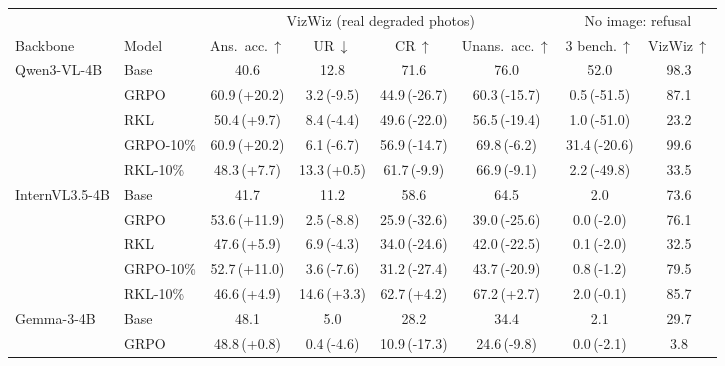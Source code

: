 \begin{table}[t]
\centering\small
\setlength{\tabcolsep}{5pt}
\begin{tabular}{llcccc|cc}
\toprule
& & \multicolumn{4}{c|}{VizWiz (real degraded photos)} & \multicolumn{2}{c}{No image: refusal} \\
\cmidrule(lr){3-6}\cmidrule(lr){7-8}
Backbone & Model & Ans.\ acc.\,$\uparrow$ & UR\,$\downarrow$ & CR\,$\uparrow$ & Unans.\ acc.\,$\uparrow$ & 3 bench.\,$\uparrow$ & VizWiz\,$\uparrow$ \\
\midrule
\multirow{5}{*}{Qwen3-VL-4B} & Base & 40.6 & 12.8 & 71.6 & 76.0 & 52.0 & 98.3 \\
 & GRPO & 60.9\,{\scriptsize(+20.2)} & 3.2\,{\scriptsize(-9.5)} & 44.9\,{\scriptsize(-26.7)} & 60.3\,{\scriptsize(-15.7)} & 0.5\,{\scriptsize(-51.5)} & 87.1 \\
 & RKL & 50.4\,{\scriptsize(+9.7)} & 8.4\,{\scriptsize(-4.4)} & 49.6\,{\scriptsize(-22.0)} & 56.5\,{\scriptsize(-19.4)} & 1.0\,{\scriptsize(-51.0)} & 23.2 \\
 & GRPO-10\% & 60.9\,{\scriptsize(+20.2)} & 6.1\,{\scriptsize(-6.7)} & 56.9\,{\scriptsize(-14.7)} & 69.8\,{\scriptsize(-6.2)} & 31.4\,{\scriptsize(-20.6)} & 99.6 \\
 & RKL-10\% & 48.3\,{\scriptsize(+7.7)} & 13.3\,{\scriptsize(+0.5)} & 61.7\,{\scriptsize(-9.9)} & 66.9\,{\scriptsize(-9.1)} & 2.2\,{\scriptsize(-49.8)} & 33.5 \\
\midrule
\multirow{5}{*}{InternVL3.5-4B} & Base & 41.7 & 11.2 & 58.6 & 64.5 & 2.0 & 73.6 \\
 & GRPO & 53.6\,{\scriptsize(+11.9)} & 2.5\,{\scriptsize(-8.8)} & 25.9\,{\scriptsize(-32.6)} & 39.0\,{\scriptsize(-25.6)} & 0.0\,{\scriptsize(-2.0)} & 76.1 \\
 & RKL & 47.6\,{\scriptsize(+5.9)} & 6.9\,{\scriptsize(-4.3)} & 34.0\,{\scriptsize(-24.6)} & 42.0\,{\scriptsize(-22.5)} & 0.1\,{\scriptsize(-2.0)} & 32.5 \\
 & GRPO-10\% & 52.7\,{\scriptsize(+11.0)} & 3.6\,{\scriptsize(-7.6)} & 31.2\,{\scriptsize(-27.4)} & 43.7\,{\scriptsize(-20.9)} & 0.8\,{\scriptsize(-1.2)} & 79.5 \\
 & RKL-10\% & 46.6\,{\scriptsize(+4.9)} & 14.6\,{\scriptsize(+3.3)} & 62.7\,{\scriptsize(+4.2)} & 67.2\,{\scriptsize(+2.7)} & 2.0\,{\scriptsize(-0.1)} & 85.7 \\
\midrule
\multirow{6}{*}{Gemma-3-4B} & Base & 48.1 & 5.0 & 28.2 & 34.4 & 2.1 & 29.7 \\
 & GRPO & 48.8\,{\scriptsize(+0.8)} & 0.4\,{\scriptsize(-4.6)} & 10.9\,{\scriptsize(-17.3)} & 24.6\,{\scriptsize(-9.8)} & 0.0\,{\scriptsize(-2.1)} & 3.8 \\

\end{tabular}
\end{table}

